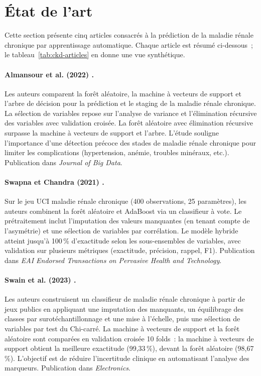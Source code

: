 \section{État de l'art}
\label{sec:etat-art}

Cette section présente cinq articles consacrés à la prédiction de la maladie rénale chronique par apprentissage automatique. Chaque article est résumé ci-dessous~; le tableau~\ref{tab:ckd-articles} en donne une vue synthétique.

\paragraph{Almansour et al. (2022) \cite{almansour2022ckd}.}
Les auteurs comparent la forêt aléatoire, la machine à vecteurs de support et l'arbre de décision pour la prédiction et le staging de la maladie rénale chronique. La sélection de variables repose sur l'analyse de variance et l'élimination récursive des variables avec validation croisée. La forêt aléatoire avec élimination récursive surpasse la machine à vecteurs de support et l'arbre. L'étude souligne l'importance d'une détection précoce des stades de maladie rénale chronique pour limiter les complications (hypertension, anémie, troubles minéraux, etc.). Publication dans \emph{Journal of Big Data}.

\paragraph{Swapna et Chandra (2021) \cite{swapna2021ckd}.}
Sur le jeu UCI maladie rénale chronique (400 observations, 25 paramètres), les auteurs combinent la forêt aléatoire et AdaBoost via un classifieur à vote. Le prétraitement inclut l'imputation des valeurs manquantes (en tenant compte de l'asymétrie) et une sélection de variables par corrélation. Le modèle hybride atteint jusqu'à 100\,\% d'exactitude selon les sous-ensembles de variables, avec validation sur plusieurs métriques (exactitude, précision, rappel, F1). Publication dans \emph{EAI Endorsed Transactions on Pervasive Health and Technology}.

\paragraph{Swain et al. (2023) \cite{swain2023ckd}.}
Les auteurs construisent un classifieur de maladie rénale chronique à partir de jeux publics en appliquant une imputation des manquants, un équilibrage des classes par surotéchantillonnage et une mise à l'échelle, puis une sélection de variables par test du Chi-carré. La machine à vecteurs de support et la forêt aléatoire sont comparées en validation croisée 10 folds~: la machine à vecteurs de support obtient la meilleure exactitude (99,33\,\%), devant la forêt aléatoire (98,67\,\%). L'objectif est de réduire l'incertitude clinique en automatisant l'analyse des marqueurs. Publication dans \emph{Electronics}.

